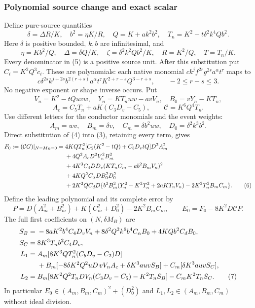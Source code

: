 \subsubsection*{Polynomial source change and exact scalar}

Define pure-source quantities
\[
 \delta=\Delta R/K,\quad b^2=\eta K/R,\quad
 Q=K+ak^2b^2,\quad T_n=K^2-t\delta^2k^4Qb^2.
\]
Here $\delta$ is positive bounded, $k,b$ are infinitesimal, and
\begin{equation}
 \eta=Kb^2/Q,\quad \Delta=\delta Q/K,\quad
 \zeta=\delta^2k^2Qb^2/K,\quad R=K^2/Q,\quad T=T_n/K.       \tag{5}
\end{equation}
Every denominator in (5) is a positive source unit. After this
substitution put $C_i=K^2Q^3c_i$. These are polynomials: each native
monomial $c k^jf^{2r}g^{2s}a^\alpha t^\tau$ maps to
\[
 c\delta^{2s}k^{j+2s}b^{2(r+s)}a^\alpha t^\tau
 K^{2+r-s}Q^{3-r+s},\qquad -2\leq r-s\leq3.
\]
No negative exponent or shape inverse occurs. Put
\[
 V_n=K^2-tQuvw,\quad Y_n=KT_nuw-avV_n,\quad B_0=vY_n-KT_n,
\]
\[
 A_c=C_5T_n+aK(C_3D_v-C_5),\qquad \mathcal C=K^6Q^4T_n.
\]
Use different letters for the conductor monomials and the event weights:
\[
 A_m=wv,\quad B_m=\delta v,\quad C_m=\delta b^2uw,
 \quad D_0=\delta^2k^3b^2.
\]
Direct substitution of (4) into (3), retaining every term, gives
\begin{align}
 F_0:=(\mathcal CG)|_{N=M_B=0}={}&
 4KQT_n^2[C_2(K^2-tQ)+C_bD_vtQ]D^2 A_m^2\notag\\
 &+4Q^2A_cD^2V_n^2B_m^2\notag\\
 &+4K^3C_4DD_v(KT_nC_m-ab^2B_mV_n)^2\notag\\
 &+4KQ^2C_\alpha DB_0^2D_0^2\notag\\
 &+2K^2QC_dD\{b^2B_m^2(Y_n^2-K^2T_n^2+2aKT_nV_n)
                         -2K^2T_n^2B_mC_m\}.             \tag{6}
\end{align}
Define the leading polynomial and its complete error by
\[
 P=D(A_m^2+B_m^2)+K(C_m^2+D_0^2)-2K^2B_mC_m,
 \qquad E_0=F_0-8K^2D\mathcal CP.
\]
The full first coefficients on $(N,\delta M_B)$ are
\begin{align}
 S_B={}&-8aK^2b^4C_4D_vV_n
       +8\delta^2Q^2k^6b^4C_\alpha B_0+4KQb^2C_dB_0,\notag\\
 S_C={}&8K^3T_nb^2C_4D_v,\notag\\
 L_1={}&A_m[8K^3QT_n^2(C_bD_v-C_2)D]\notag\\
 &+B_m[-8\delta K^2Q^2uD\,vV_nA_c+\delta K^3auvS_B]
   +C_m[\delta K^3auvS_C],\notag\\
 L_2={}&B_m[8K^2Q^2T_nDV_n(C_3D_v-C_5)-K^2T_nS_B]
          -C_mK^2T_nS_C.                               \tag{7}
\end{align}
In particular $E_0\in(A_m,B_m,C_m)^2+(D_0^2)$ and
$L_1,L_2\in(A_m,B_m,C_m)$ without ideal division.

